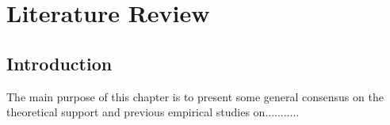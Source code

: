 \chapter{Literature Review}

\section{Introduction}
The main purpose of this chapter is to present some general consensus on the theoretical support and previous empirical studies on...........

